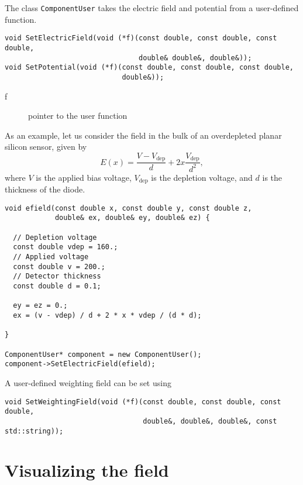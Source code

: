 The class \texttt{ComponentUser} takes the electric field and potential
from a user-defined function.
\begin{lstlisting}
void SetElectricField(void (*f)(const double, const double, const double, 
                                double& double&, double&));
void SetPotential(void (*f)(const double, const double, const double, 
                            double&));
\end{lstlisting}
\begin{description}
  \item[f] pointer to the user function
\end{description}

As an example, let us consider the field in the bulk of an overdepleted 
planar silicon sensor, given by
\begin{equation*}
E\left(x\right) = \frac{V - V_{\text{dep}}}{d} + 
                    2x \frac{V_{\text{dep}}}{d^{2}},
\end{equation*}
where \(V\) is the applied bias voltage, \(V_{\text{dep}}\) is 
the depletion voltage, and \(d\) is the thickness of the diode.
\begin{lstlisting}
void efield(const double x, const double y, const double z,
            double& ex, double& ey, double& ez) {

  // Depletion voltage
  const double vdep = 160.;
  // Applied voltage
  const double v = 200.;
  // Detector thickness
  const double d = 0.1;

  ey = ez = 0.;
  ex = (v - vdep) / d + 2 * x * vdep / (d * d);

}

ComponentUser* component = new ComponentUser();
component->SetElectricField(efield);

\end{lstlisting}

A user-defined weighting field can be set using
\begin{lstlisting}
void SetWeightingField(void (*f)(const double, const double, const double,
                                 double&, double&, double&, const std::string));
\end{lstlisting}

\section{Visualizing the field}

